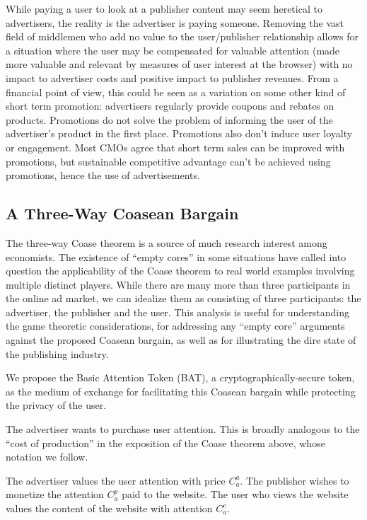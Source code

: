 \documentclass[11pt]{article}
\begin{document}
While paying a user to look at a publisher content may seem
heretical to advertisers, the reality is the advertiser is paying
someone. Removing the vast field of middlemen who add no
value to the user/publisher relationship allows for a situation where
the user may be compensated for valuable attention (made more
valuable and relevant by measures of user interest at the browser)
with no impact to advertiser costs and positive impact to publisher
revenues. From a financial point of view, this could be seen as a
variation on some other kind of short term promotion: advertisers
regularly provide coupons and rebates on products. Promotions do not
solve the problem of informing the user of the advertiser's product in
the first place. Promotions also don't induce user loyalty or
engagement. Most CMOs agree that short term sales can be improved with
promotions, but sustainable competitive advantage can't be achieved
using promotions, hence the use of advertisements. 

\subsection{A Three-Way Coasean Bargain}
\label{sec-8-2}

The three-way Coase theorem is a source of much research interest
among economists. The existence of ``empty cores'' in some situations
have called into question the applicability of the Coase theorem to
real world examples involving multiple distinct players\cite{20}. While there
are many more than three participants in the online ad market, we can
idealize them as consisting of three participants: the advertiser, the
publisher and the user. This analysis is useful for understanding the
game theoretic considerations, for addressing any ``empty core''
arguments against the proposed Coasean bargain, as well as for
illustrating the dire state of the publishing industry. 

We propose the Basic Attention Token (BAT), a cryptographically-secure
token, as the medium of exchange for facilitating this Coasean bargain
while protecting the privacy of the user.

The advertiser wants to purchase user attention. This is broadly
analogous to the ``cost of production'' in the exposition of the Coase
theorem above, whose notation we follow. 

The advertiser values the user attention with price $C^{a}_a$. The publisher wishes to 
monetize the attention $C^{p}_a$ paid to the website. The user who views the website 
values the content of the website with attention $C^{c}_a$.
\end{document}
